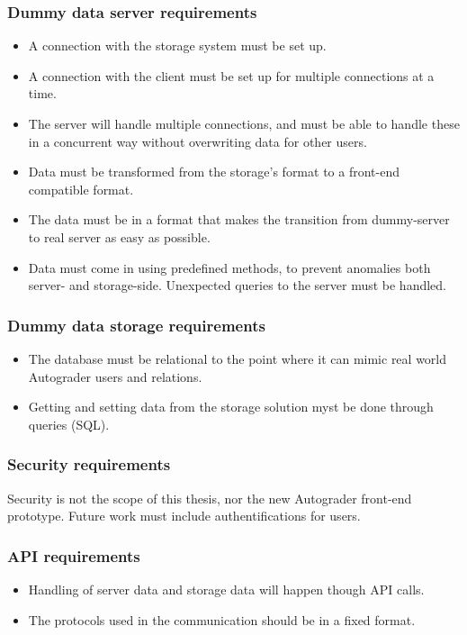 \subsubsection{Dummy data server requirements}
\begin{itemize}
\item A connection with the storage system must be set up.
\item A connection with the client must be set up for multiple connections at a time.
\item The server will handle multiple connections, and must be able to handle these in a concurrent way without overwriting data for other users.
\item Data must be transformed from the storage's format to a front-end compatible format.
\item The data must be in a format that makes the transition from dummy-server to real server as easy as possible.
\item Data must come in using predefined methods, to prevent anomalies both server- and storage-side. Unexpected queries to the server must be handled.
\end{itemize}

\subsubsection{Dummy data storage requirements}
\begin{itemize}
\item The database must be relational to the point where it can mimic real world Autograder users and relations.
\item Getting and setting data from the storage solution myst be done through queries (SQL).
\end{itemize}

\subsubsection{Security requirements}
Security is not the scope of this thesis, nor the new Autograder front-end prototype. Future work must include authentifications for users.

\subsubsection{API requirements}
\begin{itemize}
\item Handling of server data and storage data will happen though API calls.
\item The protocols used in the communication should be in a fixed format.
\end{itemize}

